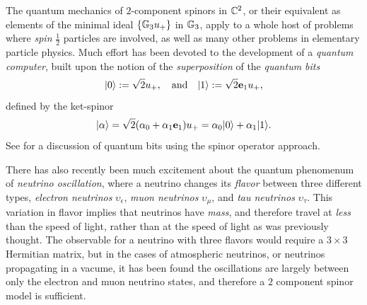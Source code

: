 \documentclass[]{article}
\begin{document}
 The quantum mechanics of $2$-component spinors in $\mathbb{C}^2$, or their equivalent as elements of the minimal ideal $\{\mathbb{G}_3 u_+\}$ in $\mathbb{G}_3$, apply
 to a whole host of problems where {\it spin} $\frac{1}{2}$ particles are involved, as well as many other problems in elementary particle physics.
 Much effort has been devoted to the development of a {\it quantum computer}, built upon the notion of the {\it superposition} of the {\it quantum bits}
 \[  |0 \rangle := \sqrt 2 u_+, \quad {\rm and} \quad |1\rangle := \sqrt 2 \mathbf{e}_1 u_+,\]
 defined by the ket-spinor 
 \[| \alpha \rangle =\sqrt 2 (\alpha_0+\alpha_1 \mathbf{e}_1)u_+ = \alpha_0 |0 \rangle + \alpha_1 |1 \rangle. \] 
 See \cite{HD02} for a discussion of quantum bits using the spinor operator approach. 
 
 There has also recently been much excitement about the quantum phenomenum of {\it neutrino oscillation}, where a neutrino changes its
 {\it flavor} between three different types, {\it electron neutrinos} $\upsilon_\epsilon$, {\it muon neutrinos} $\upsilon_\mu$, and
 {\it tau neutrinos} $\upsilon_\tau$. This variation in flavor implies that neutrinos have {\it mass}, and therefore travel at {\it less}
 than the speed of light, rather than at the speed of light as was previously thought. The observable for a neutrino with three flavors would require a $3\times 3$
 Hermitian matrix, but in the cases of atmospheric neutrinos, or neutrinos propagating in a vacume, it has been found the
 oscillations are largely between only the electron and muon neutrino states, and therefore a $2$ component 
 spinor model is sufficient. 
 
\end{document}
